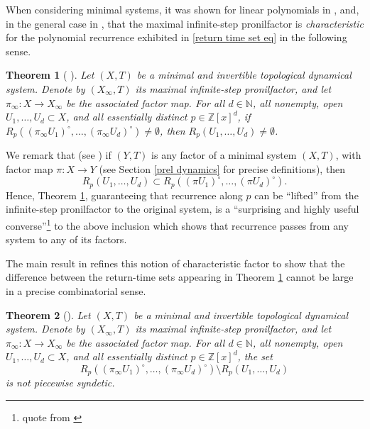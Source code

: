 \documentclass[reqno]{amsart}
\def\Z{{\mathbb Z}}
\def\N{{\mathbb N}}
\newtheorem{theorem}{Theorem}[section]
\theoremstyle{definition}
\theoremstyle{remark}
\def\N{{\mathbb N}}
\begin{document}
When considering minimal systems, it was shown for 
linear polynomials 
in \cite{Glasner_Huang_Shao_Weiss_Ye}, and, in the general case in \cite{Qiu}, that the 
maximal infinite-step 
pronilfactor is \textit{characteristic} for the 
polynomial recurrence 
exhibited in \eqref{return time set eq} in the following 
sense. 
\begin{theorem}[{ {\cite[Theorem B]{Qiu}}}]\label{Qiu}
Let $(X,T)$ be a minimal and invertible
topological dynamical system. Denote by $(X_{\infty},T)$ its maximal infinite-step pronilfactor, and let $\pi_{\infty}: X \to X_{\infty}$ be the associated factor map. For all $d\in \N$, all nonempty, open $U_1,\ldots,U_d \subset X$, and all 
essentially distinct $p\in \Z[x]^d$, if $R_p((\pi_{\infty} U_1)^{\circ},\ldots,(\pi_{\infty} U_d)^{\circ}) \neq \emptyset$, then $R_p(U_1,\ldots,U_d) \neq \emptyset$. 
\end{theorem}
We remark that (see \cite[Lemma 3.2]{GKLMRR}) if $(Y,T)$ is any factor of a minimal system 
$(X,T)$, with factor map
$\pi:X\to Y$ (see Section 
\ref{prel dynamics} for precise definitions), then 
\begin{equation}\label{inclusion_0} 
R_p(U_1,\ldots,U_d) \subset R_p((\pi U_1)^{\circ},\ldots,(\pi U_d)^{\circ}).    
\end{equation}
Hence, Theorem \ref{Qiu}, guaranteeing that recurrence along 
$p$ can be ``lifted'' from the infinite-step pronilfactor to the
original system, is a ``surprising and highly useful converse''\footnote{quote from \cite[page 3]{GKLMRR}} to 
the above inclusion which shows that recurrence passes from any 
system to any of its factors. 

The main result in 
\cite{GKLMRR} refines this notion of characteristic factor to show 
that the difference between the return-time sets appearing in 
Theorem \ref{Qiu} cannot be large in a precise combinatorial 
sense. 

\begin{theorem}[{{\cite[Theorem A]{GKLMRR}}}]\label{GKMLRR}
Let $(X,T)$ be a minimal and invertible
topological dynamical system. Denote by $(X_{\infty},T)$ its maximal infinite-step pronilfactor, and let $\pi_{\infty}: X \to X_{\infty}$ be the associated factor map. For all $d\in \N$, all nonempty, open $U_1,\ldots,U_d \subset X$, and all 
essentially distinct $p\in \Z[x]^d$, the set 
\begin{equation}\label{set difference of return times}
R_p((\pi_{\infty} U_1)^{\circ},\ldots,(\pi_{\infty} U_d)^{\circ}) \setminus R_p(U_1,\ldots,U_d)     
\end{equation}   
is not piecewise syndetic.
\end{theorem}
\end{document}

